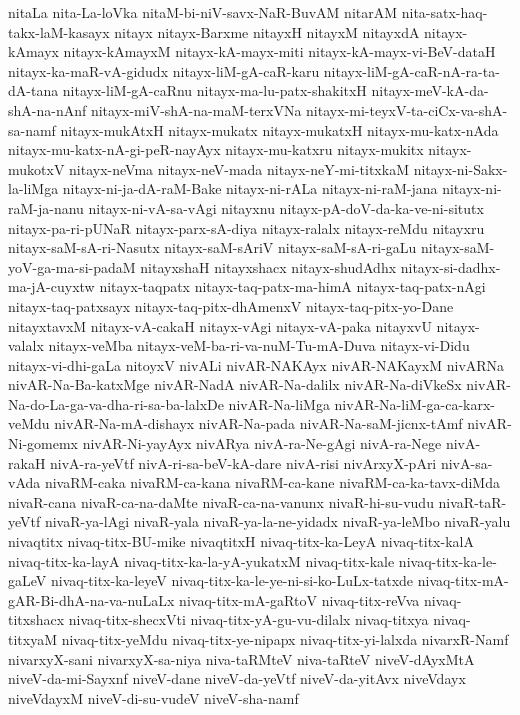 {nitaLa
nita-La-loVka
nitaM-bi-niV-savx-NaR-BuvAM
nitarAM
nita-satx-haq-takx-laM-kasayx
nitayx
nitayx-Barxme
nitayxH
nitayxM
nitayxdA
nitayx-kAmayx
nitayx-kAmayxM
nitayx-kA-mayx-miti
nitayx-kA-mayx-vi-BeV-dataH
nitayx-ka-maR-vA-gidudx
nitayx-liM-gA-caR-karu
nitayx-liM-gA-caR-nA-ra-ta-dA-tana
nitayx-liM-gA-caRnu
nitayx-ma-lu-patx-shakitxH
nitayx-meV-kA-da-shA-na-nAnf
nitayx-miV-shA-na-maM-terxVNa
nitayx-mi-teyxV-ta-ciCx-va-shA-sa-namf
nitayx-mukAtxH
nitayx-mukatx
nitayx-mukatxH
nitayx-mu-katx-nAda
nitayx-mu-katx-nA-gi-peR-nayAyx
nitayx-mu-katxru
nitayx-mukitx
nitayx-mukotxV
nitayx-neVma
nitayx-neV-mada
nitayx-neY-mi-titxkaM
nitayx-ni-Sakx-la-liMga
nitayx-ni-ja-dA-raM-Bake
nitayx-ni-rALa
nitayx-ni-raM-jana
nitayx-ni-raM-ja-nanu
nitayx-ni-vA-sa-vAgi
nitayxnu
nitayx-pA-doV-da-ka-ve-ni-situtx
nitayx-pa-ri-pUNaR
nitayx-parx-sA-diya
nitayx-ralalx
nitayx-reMdu
nitayxru
nitayx-saM-sA-ri-Nasutx
nitayx-saM-sAriV
nitayx-saM-sA-ri-gaLu
nitayx-saM-yoV-ga-ma-si-padaM
nitayxshaH
nitayxshacx
nitayx-shudAdhx
nitayx-si-dadhx-ma-jA-cuyxtw
nitayx-taqpatx
nitayx-taq-patx-ma-himA
nitayx-taq-patx-nAgi
nitayx-taq-patxsayx
nitayx-taq-pitx-dhAmenxV
nitayx-taq-pitx-yo-Dane
nitayxtavxM
nitayx-vA-cakaH
nitayx-vAgi
nitayx-vA-paka
nitayxvU
nitayx-valalx
nitayx-veMba
nitayx-veM-ba-ri-va-nuM-Tu-mA-Duva
nitayx-vi-Didu
nitayx-vi-dhi-gaLa
nitoyxV
nivALi
nivAR-NAKAyx
nivAR-NAKayxM
nivARNa
nivAR-Na-Ba-katxMge
nivAR-NadA
nivAR-Na-dalilx
nivAR-Na-diVkeSx
nivAR-Na-do-La-ga-va-dha-ri-sa-ba-lalxDe
nivAR-Na-liMga
nivAR-Na-liM-ga-ca-karx-veMdu
nivAR-Na-mA-dishayx
nivAR-Na-pada
nivAR-Na-saM-jicnx-tAmf
nivAR-Ni-gomemx
nivAR-Ni-yayAyx
nivARya
nivA-ra-Ne-gAgi
nivA-ra-Nege
nivA-rakaH
nivA-ra-yeVtf
nivA-ri-sa-beV-kA-dare
nivA-risi
nivArxyX-pAri
nivA-sa-vAda
nivaRM-caka
nivaRM-ca-kana
nivaRM-ca-kane
nivaRM-ca-ka-tavx-diMda
nivaR-cana
nivaR-ca-na-daMte
nivaR-ca-na-vanunx
nivaR-hi-su-vudu
nivaR-taR-yeVtf
nivaR-ya-lAgi
nivaR-yala
nivaR-ya-la-ne-yidadx
nivaR-ya-leMbo
nivaR-yalu
nivaqtitx
nivaq-titx-BU-mike
nivaqtitxH
nivaq-titx-ka-LeyA
nivaq-titx-kalA
nivaq-titx-ka-layA
nivaq-titx-ka-la-yA-yukatxM
nivaq-titx-kale
nivaq-titx-ka-le-gaLeV
nivaq-titx-ka-leyeV
nivaq-titx-ka-le-ye-ni-si-ko-LuLx-tatxde
nivaq-titx-mA-gAR-Bi-dhA-na-va-nuLaLx
nivaq-titx-mA-gaRtoV
nivaq-titx-reVva
nivaq-titxshacx
nivaq-titx-shecxVti
nivaq-titx-yA-gu-vu-dilalx
nivaq-titxya
nivaq-titxyaM
nivaq-titx-yeMdu
nivaq-titx-ye-nipapx
nivaq-titx-yi-lalxda
nivarxR-Namf
nivarxyX-sani
nivarxyX-sa-niya
niva-taRMteV
niva-taRteV
niveV-dAyxMtA
niveV-da-mi-Sayxnf
niveV-dane
niveV-da-yeVtf
niveV-da-yitAvx
niveVdayx
niveVdayxM
niveV-di-su-vudeV
niveV-sha-namf
}
